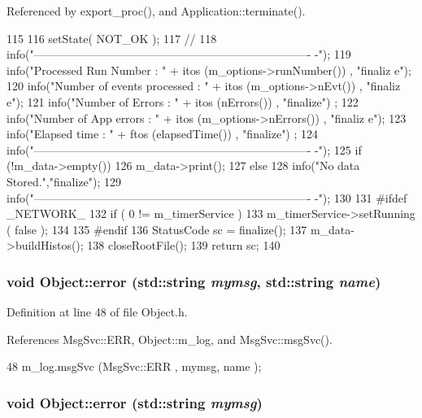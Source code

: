 Referenced by export\_\-proc(), and Application::terminate().


\begin{DoxyCode}
115                                     {
116   setState( NOT_OK );
117   // 
118   info("-------------------------------------------------------------------------
      -");
119   info("Processed Run Number       : " + itos (m_options->runNumber()) , "finaliz
      e");
120   info("Number of events processed : " + itos (m_options->nEvt())      , "finaliz
      e");
121   info("Number of Errors           : " + itos (nErrors())           , "finalize")
      ;  
122   info("Number of App errors       : " + itos (m_options->nErrors())   , "finaliz
      e");
123   info("Elapsed time               : " + ftos (elapsedTime())       , "finalize")
      ;
124   info("-------------------------------------------------------------------------
      -");
125   if (!m_data->empty()) 
126     m_data->print();
127   else 
128     info("No data Stored.","finalize");
129   info("-------------------------------------------------------------------------
      -");
130 
131 #ifdef _NETWORK_
132   if ( 0 != m_timerService ){
133     m_timerService->setRunning ( false );
134   }
135 #endif
136   StatusCode sc = finalize();
137   m_data->buildHistos();  
138   closeRootFile();
139   return sc;
140 }
\end{DoxyCode}
\hypertarget{classObject_ad7f6c457733082efa2f9ff5f5c8e119a}{
\subsubsection[{error}]{\setlength{\rightskip}{0pt plus 5cm}void Object::error (std::string {\em mymsg}, \/  std::string {\em name})}}
\label{classObject_ad7f6c457733082efa2f9ff5f5c8e119a}


Definition at line 48 of file Object.h.

References MsgSvc::ERR, Object::m\_\-log, and MsgSvc::msgSvc().


\begin{DoxyCode}
48 { m_log.msgSvc (MsgSvc::ERR     , mymsg, name ); }
\end{DoxyCode}
\hypertarget{classObject_a204a95f57818c0f811933917a30eff45}{
\subsubsection[{error}]{\setlength{\rightskip}{0pt plus 5cm}void Object::error (std::string {\em mymsg})}}
\label{classObject_a204a95f57818c0f811933917a30eff45}


